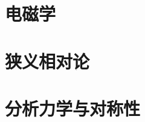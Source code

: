 \documentclass[12pt, a4paper, openany]{book}
\begin{document}
\part{电磁学}








\part{狭义相对论}




\part{分析力学与对称性}



\appendix





\printindex
\end{document}
